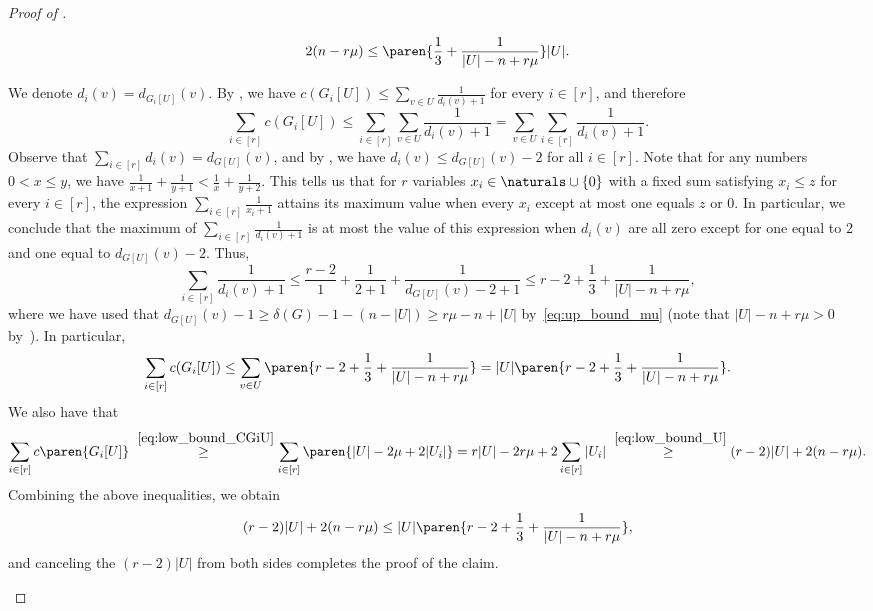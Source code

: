 \documentclass[10pt,a4paper,reqno]{amsart}
\begin{document}
\begin{proof}[Proof of ]
\begin{claim}\label{claim:up_sum_ui}
\begin{equation*}
      2(n - r\mu) \le \paren{\frac{1}{3} + \frac{1}{|U| - n + r\mu}}|U|.
\end{equation*}
\end{claim}
\begin{claimproof}
We denote $d_i(v) = d_{G_i[U]}(v)$. By , we have
$c(G_i[U]) \leq \sum_{v \in U} \frac{1}{d_i(v) + 1}$ for every $i \in [r]$, and therefore
\newpage
\begin{equation*}
      \sum_{i \in [r]} c(G_i[U]) \leq \sum_{i \in [r]} \sum_{v \in U} \frac{1}{d_i(v) + 1} = \sum_{v \in U} \sum_{i\in [r]} \frac{1}{d_i(v) + 1}.
\end{equation*}
Observe that $\sum_{i \in [r]} d_i(v) = d_{G[U]}(v)$, and by , we have $d_i(v) \leq d_{G[U]}(v) - 2$ for all $i \in [r]$. 
Note that for any numbers  $0 < x \leq y$, we have $\frac{1}{x + 1} + \frac{1}{y + 1} < \frac{1}{x} + \frac{1}{y + 2}$. This tells us that for $r$ variables $x_i \in \naturals\cup \{0\}$ with a fixed sum satisfying $x_i\le z$ for every $i\in [r]$, the expression $\sum_{i \in [r]} \frac{1}{x_i + 1}$ attains its maximum value when every $x_i$ except at most one equals $z$ or $0$. 
In particular, we conclude that the maximum of $\sum_{i \in [r]} \frac{1}{d_i(v) + 1}$ is at most the value of this expression when $d_i(v)$ are all zero except for one equal to $2$ and one equal to $d_{G[U]}(v) - 2$. Thus,
\begin{equation*}
      \sum_{i \in [r]} \frac{1}{d_i(v) + 1} \leq \frac{r - 2}{1} + \frac{1}{2+1} +
      \frac{1}{d_{G[U]}(v)-2 + 1} \leq r - 2 +\frac{1}{3} + \frac{1}{|U| - n + r\mu},
\end{equation*}
where we have used that $d_{G[U]}(v) - 1 \ge \delta(G) - 1 - (n - |U|) \ge r\mu - n + |U|$ by~\eqref{eq:up_bound_mu} (note that $|U| - n + r\mu > 0$ by~). In particular,
\begin{equation*}
      \sum_{i \in [r]} c(G_i[U]) \leq \sum_{v \in U} \paren{r - 2 + \frac{1}{3} + \frac{1}{|U| - n + r\mu}} = |U|
      \paren{r - 2+ \frac{1}{3} + \frac{1}{|U| - n + r\mu}}.
\end{equation*}
We also have that
\begin{equation*}
      \sum_{i \in [r]} c\paren{G_i[U]} \stackrel{~\eqref{eq:low_bound_CGiU}}{\geq} \sum_{i \in [r]}
      \paren{|U| - 2\mu + 2|U_i|} = r|U| - 2r\mu + 2\sum_{i \in [r]} |U_i|
      \stackrel{~\eqref{eq:low_bound_U}}{\geq}
      (r-2)|U| + 2(n-r\mu).
\end{equation*}
Combining the above inequalities, we obtain
\begin{equation*}
       (r-2)|U| + 2(n-r\mu) \leq |U| \paren{r - 2 + \frac{1}{3} + \frac{1}{|U| - n + r\mu}},
\end{equation*}
and canceling the $(r-2)|U|$ from both sides completes the proof of the claim.
\end{claimproof}


\end{proof}
\end{document}
